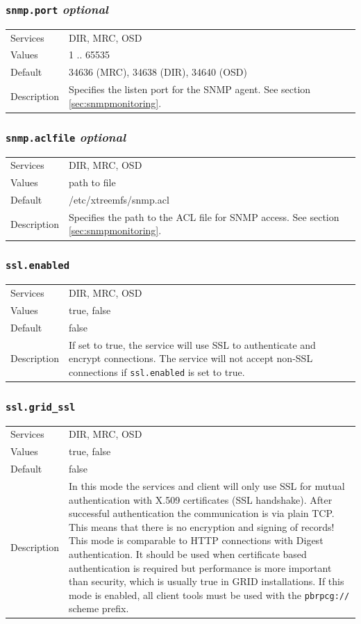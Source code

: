 \documentclass[a4paper,10pt]{book}
\begin{document}
\subsubsection{\texttt{snmp.port} \textit{optional}}
\begin{tabular}{lp{10cm}}
 Services & DIR, MRC, OSD\\
 Values   & 1 .. 65535\\
 Default  & 34636 (MRC), 34638 (DIR), 34640 (OSD)\\
 Description & Specifies the listen port for the SNMP agent. See section \ref{sec:snmpmonitoring}.
\end{tabular}

\subsubsection{\texttt{snmp.aclfile} \textit{optional}}
\begin{tabular}{lp{10cm}}
 Services & DIR, MRC, OSD\\
 Values   & path to file\\
 Default  & /etc/xtreemfs/snmp.acl\\
 Description & Specifies the path to the ACL file for SNMP access. See section \ref{sec:snmpmonitoring}.
\end{tabular}

\subsubsection{\texttt{ssl.enabled}}
\begin{tabular}{lp{10cm}}
 Services & DIR, MRC, OSD\\
 Values   & true, false \\
 Default  & false \\
 Description & If set to true, the service will use SSL to authenticate and encrypt connections. The service will not accept non-SSL connections if \texttt{ssl.enabled} is set to true.
\end{tabular}

\subsubsection{\texttt{ssl.grid\_ssl}}
\begin{tabular}{lp{10cm}}
 Services & DIR, MRC, OSD\\
 Values   & true, false \\
 Default  & false \\
 Description & In this mode the services and client will only use SSL for mutual authentication with X.509 certificates (SSL handshake). After successful authentication the communication is via plain TCP. This means that there is no encryption and signing of records! This mode is comparable to HTTP connections with Digest authentication. It should be used when certificate based authentication is required but performance is more important than security, which is usually true in GRID installations. If this mode is enabled, all client tools must be used with the \texttt{pbrpcg://} scheme prefix.
\end{tabular}
\end{document}
